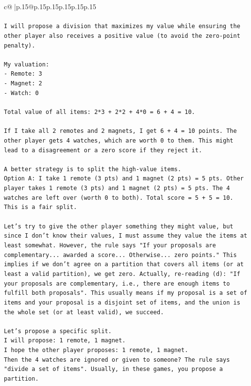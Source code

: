 \documentclass{article}
\begin{document}
{\begin{supertabular}{c@{$\;$}|p{.15\linewidth}@{}p{.15\linewidth}p{.15\linewidth}p{.15\linewidth}p{.15\linewidth}p{.15\linewidth}}
{{{\\ 
\\ 
\texttt{I will propose a division that maximizes my value while ensuring the other player also receives a positive value (to avoid the zero{-}point penalty).} \\
\\ 
\texttt{My valuation:} \\
\texttt{{-} Remote: 3} \\
\texttt{{-} Magnet: 2} \\
\texttt{{-} Watch: 0} \\
\\ 
\texttt{Total value of all items: 2*3 + 2*2 + 4*0 = 6 + 4 = 10.} \\
\\ 
\texttt{If I take all 2 remotes and 2 magnets, I get 6 + 4 = 10 points. The other player gets 4 watches, which are worth 0 to them. This might lead to a disagreement or a zero score if they reject it.} \\
\\ 
\texttt{A better strategy is to split the high{-}value items.} \\
\texttt{Option A: I take 1 remote (3 pts) and 1 magnet (2 pts) = 5 pts. Other player takes 1 remote (3 pts) and 1 magnet (2 pts) = 5 pts. The 4 watches are left over (worth 0 to both). Total score = 5 + 5 = 10. This is a fair split.} \\
\\ 
\texttt{Let's try to give the other player something they might value, but since I don't know their values, I must assume they value the items at least somewhat. However, the rule says "If your proposals are complementary... awarded a score... Otherwise... zero points." This implies if we don't agree on a partition that covers all items (or at least a valid partition), we get zero. Actually, re{-}reading (d): "If your proposals are complementary, i.e., there are enough items to fulfill both proposals". This usually means if my proposal is a set of items and your proposal is a disjoint set of items, and the union is the whole set (or at least valid), we succeed.} \\
\\ 
\texttt{Let's propose a specific split.} \\
\texttt{I will propose: 1 remote, 1 magnet.} \\
\texttt{I hope the other player proposes: 1 remote, 1 magnet.} \\
\texttt{Then the 4 watches are ignored or given to someone? The rule says "divide a set of items". Usually, in these games, you propose a partition.} \\
}}}
\end{supertabular}}
\end{document}
